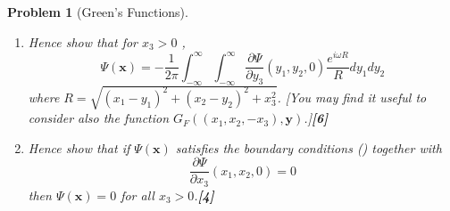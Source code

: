 \documentclass[a4paper]{article}
\theoremstyle{new}
\newtheorem{qns}{Problem}[section]
\begin{document}
\begin{qns}[Green's Functions]
\begin{enumerate}[label=(\roman*)]
$$\begin{array}{ll}
      0 & \text{ for }\mathbf{x}\text{ such that }x_3<0
        \end{array}
    \right.$$
\item Hence show that for $x_3 > 0$ ,
$$\Psi(\mathbf{x})=-\frac{1}{2\pi}\int_{-\infty}^\infty\int_{-\infty}^\infty\frac{\partial\Psi}{\partial y_3}(y_1,y_2,0)\frac{e^{i\omega R}}{R}dy_1dy_2$$
where $R=\sqrt{(x_1-y_1)^2+(x_2-y_2)^2+x_3^2}$. [You may find it useful to consider also the function $G_F ((x_1, x_2,−x_3), \mathbf{y})$.]\hfill\textbf{[6]}
\item Hence show that if $\Psi(\mathbf{x})$ satisfies the boundary conditions (\dag) together with
$$\frac{\partial\Psi}{\partial x_3}(x_1,x_2,0)=0$$
then $\Psi(\mathbf{x}) = 0$ for all $x_3 > 0$.\hfill\textbf{[4]}
\end{enumerate}
\end{qns}
\newpage
\end{document}
